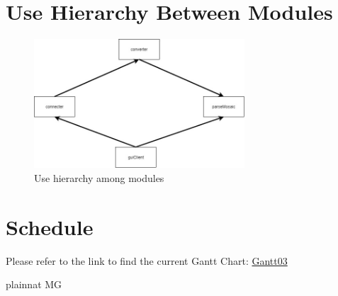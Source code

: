 \documentclass[12pt, titlepage]{article}
\begin{document}
\section{Use Hierarchy Between Modules} \label{SecUse}

\begin{figure}[H]
\centering
\includegraphics[width=0.7\textwidth]{uh.jpg}
\caption{Use hierarchy among modules}
\label{FigUH}
\end{figure}

\section{Schedule}
Please refer to the link to find the current Gantt Chart:
\color{blue}
\href{https://gitlab.cas.mcmaster.ca/liangw15/3XA3Project/blob/working/ProjectSchedule/Group12_Gantt03.pdf}{ Gantt03}

\color{black}


 {plainnat}
 {MG}
\end{document}
